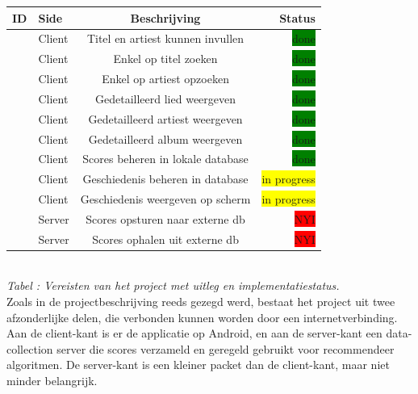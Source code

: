 \documentclass[11pt,a4paper]{article}
\newcommand{\boxgreen}{\colorbox{green}{\color{black}done}}
\newcommand{\boxyellow}{\colorbox{yellow}{\color{black}in progress}}
\newcommand{\boxred}{\colorbox{red}{\color{black}NYI}}
\newcounter{reqc}
\newcommand{\reqID} {%
   \stepcounter{reqc}%
   \thereqc}
\newcounter{tabc}
\newcommand{\tabID} {%
   \stepcounter{tabc}%
   \thetabc}
\begin{document}
	\begin{tabular}{| l | l | c | r |}
	\hline
	ID 		& 	Side	&	Beschrijving						& Status 		\\ \hline \hline
	\reqID	&	Client	&	Titel en artiest kunnen invullen	& \boxgreen 	\\ \hline
	\reqID 	&	Client	&	Enkel op titel zoeken				& \boxgreen		\\ \hline
	\reqID	& 	Client	&	Enkel op artiest opzoeken 			& \boxgreen		\\ \hline
	\reqID 	& 	Client	&	Gedetailleerd lied weergeven		& \boxgreen 	\\ \hline
	\reqID 	& 	Client	&	Gedetailleerd artiest weergeven		& \boxgreen 	\\ \hline
	\reqID 	& 	Client	&	Gedetailleerd album weergeven		& \boxgreen 	\\ \hline
	\reqID	& 	Client	&	Scores beheren in lokale database	& \boxgreen  	\\ \hline
	\reqID	& 	Client	&	Geschiedenis beheren in database	& \boxyellow  	\\ \hline
	\reqID	& 	Client	&	Geschiedenis weergeven op scherm	& \boxyellow  	\\ \hline
	\reqID	& 	Server	&	Scores opsturen naar externe db		& \boxred 		\\ \hline
	\reqID	&	Server	&	Scores ophalen uit externe db		& \boxred		\\ \hline
	\end{tabular} \\ \newline
	\small \textit{Tabel \tabID : Vereisten van het project met uitleg en implementatiestatus.} \normalsize
	\\ \newline
	Zoals in de projectbeschrijving reeds gezegd werd, bestaat het project uit twee afzonderlijke delen, die verbonden kunnen worden door een internetverbinding. Aan de client-kant is er de applicatie op Android, en aan de server-kant een data-collection server die scores verzameld en geregeld gebruikt voor recommendeer algoritmen. De server-kant is een kleiner packet dan de client-kant, maar niet minder belangrijk. 
	\\ \newline
	
\end{document}
